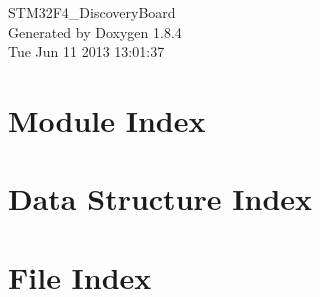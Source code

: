 \documentclass[twoside]{book}
\newcommand{\clearemptydoublepage}{%
  \newpage{\pagestyle{empty}\cleardoublepage}%
}
\begin{document}
\hypersetup{pageanchor=false}
\begin{titlepage}
\vspace*{7cm}
\begin{center}%
{\Large S\-T\-M32\-F4\-\_\-\-Discovery\-Board }\\
\vspace*{1cm}
{\large Generated by Doxygen 1.8.4}\\
\vspace*{0.5cm}
{\small Tue Jun 11 2013 13:01:37}\\
\end{center}
\end{titlepage}
\clearemptydoublepage
\tableofcontents
\clearemptydoublepage
{}
\hypersetup{pageanchor=true}

\chapter{Module Index}

\chapter{Data Structure Index}

\chapter{File Index}

\end{document}
